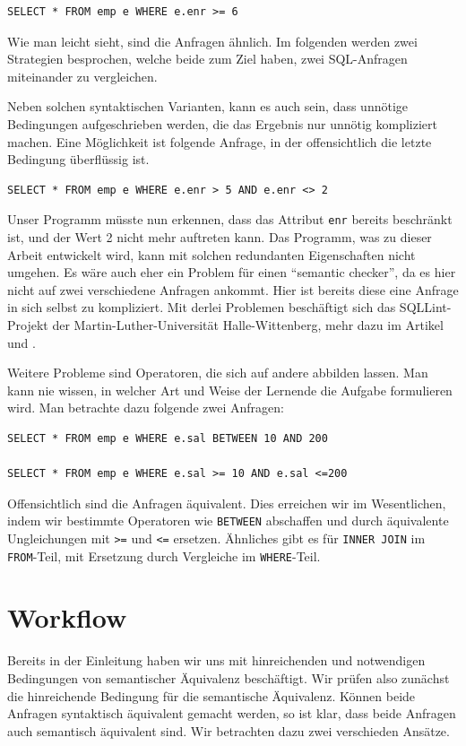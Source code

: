 \begin{verbatim}
SELECT * FROM emp e WHERE e.enr >= 6
\end{verbatim}

Wie man leicht sieht, sind die Anfragen ähnlich. Im folgenden werden zwei Strategien besprochen, welche beide zum Ziel haben, zwei SQL-Anfragen miteinander zu vergleichen.

Neben solchen syntaktischen Varianten, kann es auch sein, dass unnötige Bedingungen aufgeschrieben werden, die das Ergebnis nur unnötig kompliziert machen. Eine Möglichkeit ist folgende Anfrage, in der offensichtlich die letzte Bedingung überflüssig ist.
\begin{verbatim}
SELECT * FROM emp e WHERE e.enr > 5 AND e.enr <> 2
\end{verbatim}

Unser Programm müsste nun erkennen, dass das Attribut \verb|enr| bereits beschränkt ist, und der Wert 2 nicht mehr auftreten kann. Das Programm, was zu dieser Arbeit entwickelt wird, kann mit solchen redundanten Eigenschaften nicht umgehen. Es wäre auch eher ein Problem für einen ``semantic checker'', da es hier nicht auf zwei verschiedene Anfragen ankommt. Hier ist bereits diese eine Anfrage in sich selbst zu kompliziert. Mit derlei Problemen beschäftigt sich das SQLLint-Projekt der Martin-Luther-Universität Halle-Wittenberg, mehr dazu im Artikel \cite{brass1} und \cite{brass2}.

Weitere Probleme sind Operatoren, die sich auf andere abbilden lassen. Man kann nie wissen, in welcher Art und Weise der Lernende die Aufgabe formulieren wird. Man betrachte dazu folgende zwei Anfragen:
\begin{verbatim}
SELECT * FROM emp e WHERE e.sal BETWEEN 10 AND 200

SELECT * FROM emp e WHERE e.sal >= 10 AND e.sal <=200
\end{verbatim}

Offensichtlich sind die Anfragen äquivalent. Dies erreichen wir im Wesentlichen, indem wir bestimmte Operatoren wie \verb|BETWEEN| abschaffen und durch äquivalente Ungleichungen mit \verb|>=| und \verb|<=| ersetzen. Ähnliches gibt es für \verb|INNER JOIN| im \verb|FROM|-Teil, mit Ersetzung durch Vergleiche im \verb|WHERE|-Teil. 

\section{Workflow}

Bereits in der Einleitung haben wir uns mit hinreichenden und notwendigen Bedingungen von semantischer Äquivalenz beschäftigt. Wir prüfen also zunächst die hinreichende Bedingung für die semantische Äquivalenz. Können beide Anfragen syntaktisch äquivalent gemacht werden, so ist klar, dass beide Anfragen auch semantisch äquivalent sind. Wir betrachten dazu zwei verschieden Ansätze. 

